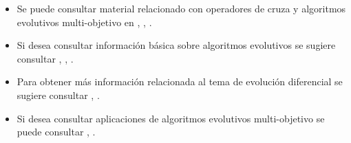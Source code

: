 \begin{itemize}
\item Se puede consultar material relacionado con operadores de cruza y algoritmos evolutivos multi-objetivo en \cite{coello2007evolutionary}, \cite{Joel:Kalyanmoy}, \cite{Joel:Coello}.
\item Si desea consultar información básica sobre algoritmos evolutivos se sugiere consultar \cite{eiben2003introduction}, \cite{lobo2007parameter}, \cite{back2000evolutionary}.
\item Para obtener más información relacionada al tema de evolución diferencial se sugiere consultar \cite{price2006differential}, \cite{chakraborty2008advances}.
\item Si desea consultar aplicaciones de algoritmos evolutivos multi-objetivo se puede consultar \cite{zitzler1999evolutionary}, \cite{back1996evolutionary}.
\end{itemize}
